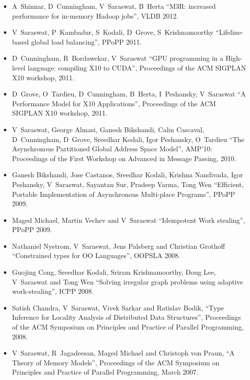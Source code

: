 \documentclass{article}
\begin{document}
\begin{itemize}
\item A~Shinnar, D~Cunningham, V~Saraswat, B~Herta
  ``M3R: increased performance for in-memory Hadoop jobs'', VLDB
  2012. 

\item V~Saraswat, P~Kambadur, S~Kodali, D~Grove, S~Krishnamoorthy ``Lifeline-based global load
  balancing'', PPoPP 2011. 

\item D~Cunningham, R~Bordawekar, V~Saraswat ``GPU
  programming in a High-level language: compiling X10 to CUDA'',
  Proceedings of the ACM SIGPLAN X10 workshop, 2011.

\item D~Grove, O~Tardieu, D~Cunningham, B~Herta, I~Peshansky, V~Saraswat ``A Performance Model for X10
  Applications'',   Proceedings of the ACM SIGPLAN X10 workshop, 2011.

\item V~Saraswat, George Almasi, Ganesh Bikshandi, Calin Cascaval,
  D~Cunningham, D~Grove, Sreedhar Kodali, Igor Peshansky,
  O~Tardieu ``The Asynchronous Partitioned Global Address Space
  Model'', AMP'10: Proceedings of the First Workshop on Advanced in
  Message Passing, 2010.
\item Ganesh Bikshandi, Jose Castanos, Sreedhar Kodali, Krishna Nandivada, Igor Peshansky, V~Saraswat, Sayantan Sur, Pradeep Varma, Tong Wen ``Efficient, Portable Implementation of Asynchronous Multi-place Programs'', PPoPP 2009.

\item Maged Michael, Martin Vechev and V~Saraswat ``Idempotent Work stealing'', PPoPP 2009.

\item Nathaniel Nystrom, V~Saraswat, Jens Palsberg and Christian
Grothoff ``Constrained types for OO Languages'', OOPSLA
2008.

\item Guojing Cong, Sreedhar Kodali, Sriram Krishnamoorthy, Doug Lee,
V~Saraswat and Tong Wen ``Solving irregular graph problems using
adaptive work-stealing'', ICPP 2008.

\item Satish Chandra, V~Saraswat, Vivek Sarkar and Ratislav Bodik,
``Type Inference for Locality Analysis of Distributed Data
Structures'', Proceedings of the ACM Symposium on Principles and
Practice of Parallel Programming, 2008.

\item V~Saraswat, R~Jagadeesan, Maged Michael and Christoph
von Praun, ``A Theory of Memory Models'', Proceedings of the ACM
Symposium on Principles and Practice of Parallel Programming, March
2007.


\end{itemize}
\end{document}

